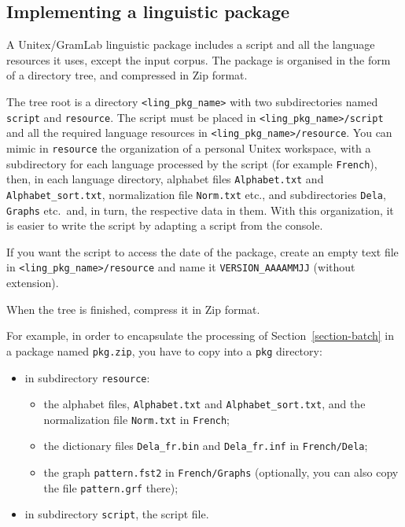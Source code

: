 \subsection{Implementing a linguistic package}
\label{section-packaga-creation}

A Unitex/GramLab linguistic package includes a script and all the language resources it uses,
except the input corpus. The package is organised in the form of a directory tree, and 
compressed in Zip format.

\bigskip
\noindent The tree root is a directory \verb$<ling_pkg_name>$ with two subdirectories
named \verb$script$ and \verb$resource$. The script must be placed in
 \verb$<ling_pkg_name>/script$ and all the required language resources in
\verb$<ling_pkg_name>/resource$. You can mimic in \verb$resource$ the organization of a
personal Unitex workspace, with a subdirectory for each language processed by the script
(for example \verb$French$), then, in each language directory, alphabet files
\verb$Alphabet.txt$ and \verb$Alphabet_sort.txt$, normalization file \verb$Norm.txt$ etc., and
subdirectories \verb$Dela$, \verb$Graphs$ etc.\ and, in turn, the respective data in them.
With this organization, it is easier to write the script by adapting a script from the console.

\bigskip
\noindent If you want the script to access the date of the package, create an empty text file in 
\verb$<ling_pkg_name>/resource$ and name it \verb$VERSION_AAAAMMJJ$
(without extension).

\bigskip
\noindent When the tree is finished, compress it in Zip format.

\bigskip
\noindent For example, in order to encapsulate the processing of Section~\ref{section-batch}
in a package named \verb$pkg.zip$, you have to copy into a \verb$pkg$ directory:
\begin{itemize}
\item in subdirectory \verb$resource$:
\begin{itemize}
\item the alphabet files, \verb$Alphabet.txt$ and \verb$Alphabet_sort.txt$, and the normalization
file \verb$Norm.txt$ in \verb$French$;
\item the dictionary files \verb$Dela_fr.bin$ and \verb$Dela_fr.inf$ in \verb$French/Dela$;
\item the graph \verb$pattern.fst2$ in \verb$French/Graphs$ (optionally, you can also copy the file
\verb$pattern.grf$ there);
\end{itemize}
\item in subdirectory \verb$script$, the script file.
\end{itemize}



